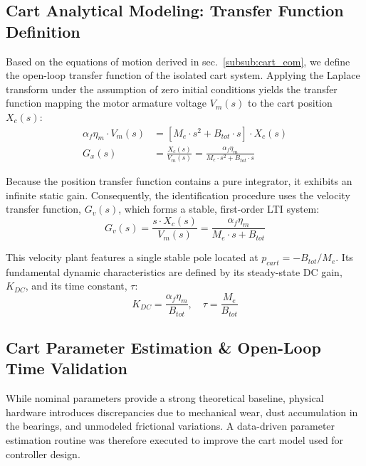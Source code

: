 \documentclass[11pt,a4paper]{article}
\begin{document}
\subsection{Cart Analytical Modeling: Transfer Function Definition}\label{sub:cart_transfer_function}
Based on the equations of motion derived in sec.~\ref{subsub:cart_eom}, we define the open-loop transfer function of the isolated cart system. Applying the Laplace transform under the assumption of zero initial conditions yields the transfer function mapping the motor armature voltage $V_m(s)$ to the cart position $X_c(s)$:
\begin{equation}
\begin{aligned}
\alpha_f \eta_m \cdot V_m(s) &= [M_e \cdot s^2 + B_{tot} \cdot s] \cdot X_c(s) \\
G_x(s) &= \frac{X_c(s)}{V_m(s)} = \frac{\alpha_f \eta_m}{M_e \cdot s^2 + B_{tot} \cdot s}
\end{aligned}
\label{eq:tf_position}
\end{equation}

Because the position transfer function contains a pure integrator, it exhibits an infinite static gain. Consequently, the identification procedure uses the velocity transfer function, $G_v(s)$, which forms a stable, first-order LTI system:
\begin{equation}
G_v(s) = \frac{s \cdot X_c(s)}{V_m(s)} = \frac{\alpha_f \eta_m}{M_e \cdot s + B_{tot}}
\label{eq:tf_velocity}
\end{equation}

This velocity plant features a single stable pole located at $p_{cart} = -B_{tot}/M_e$. Its fundamental dynamic characteristics are defined by its steady-state DC gain, $K_{DC}$, and its time constant, $\tau$:
\begin{equation}
K_{DC} = \frac{\alpha_f \eta_m}{B_{tot}}, \quad \tau = \frac{M_e}{B_{tot}}
\end{equation}

\subsection{Cart Parameter Estimation \& Open-Loop Time Validation}\label{sub:cart_param_and_time_val}
While nominal parameters provide a strong theoretical baseline, physical hardware introduces discrepancies due to mechanical wear, dust accumulation in the bearings, and unmodeled frictional variations. A data-driven parameter estimation routine was therefore executed to improve the cart model used for controller design.
\end{document}
